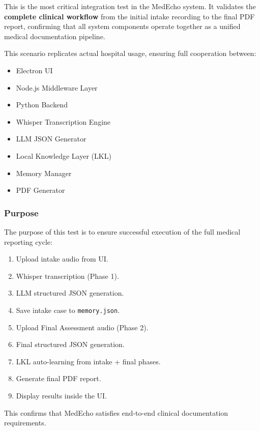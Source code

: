 This is the most critical integration test in the MedEcho system. 
It validates the \textbf{complete clinical workflow} from the initial intake recording to the 
final PDF report, confirming that all system components operate together as a unified medical 
documentation pipeline.

This scenario replicates actual hospital usage, ensuring full cooperation between:

\begin{itemize}
    \item Electron UI
    \item Node.js Middleware Layer
    \item Python Backend
    \item Whisper Transcription Engine
    \item LLM JSON Generator
    \item Local Knowledge Layer (LKL)
    \item Memory Manager
    \item PDF Generator
\end{itemize}

\subsubsection*{Purpose}

The purpose of this test is to ensure successful execution of the full medical reporting cycle:

\begin{enumerate}
    \item Upload intake audio from UI.
    \item Whisper transcription (Phase 1).
    \item LLM structured JSON generation.
    \item Save intake case to \texttt{memory.json}.
    \item Upload Final Assessment audio (Phase 2).
    \item Final structured JSON generation.
    \item LKL auto-learning from intake + final phases.
    \item Generate final PDF report.
    \item Display results inside the UI.
\end{enumerate}

This confirms that MedEcho satisfies end-to-end clinical documentation requirements.


